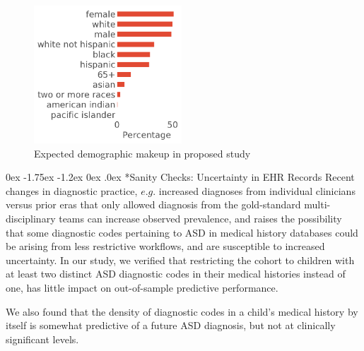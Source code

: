 \documentclass[onecolumn, compsoc,11pt]{IEEEtran}
\makeatletter
\renewcommand\subsection{\@startsection {subsection}{2}{\z@}%
                                   {0ex \@plus -1.75ex \@minus -1.2ex}%
                                   {0ex \@plus.0ex}%
                                   {\fontsize{11}{11}\selectfont\bfseries\sffamily\color{black}}}
\makeatother
\begin{document}
\begin{figure}  
  \centering
  \vspace{-17pt}
  
  \includegraphics[width=2.18in]{Figures/demo}
  \vspace{-15pt}

  
\caption{Expected demographic makeup  in proposed study}\label{tabdemo1}

\end{figure}
\subsection*{Sanity Checks: Uncertainty in EHR Records}
Recent changes in diagnostic practice, $e.g.$ increased diagnoses from individual clinicians versus prior eras that only allowed diagnosis from the gold-standard multi-disciplinary teams can  increase observed   prevalence, and  raises the possibility that  some diagnostic codes pertaining to ASD in medical history databases could be arising from less restrictive workflows, and  are susceptible to increased uncertainty.  In our study, we verified that restricting the \treatment cohort to children with at least two  distinct ASD diagnostic codes in their medical histories instead of one, has little impact on  out-of-sample predictive performance.
 
We also found that the density of diagnostic codes in a child's medical history by itself is somewhat predictive of a future ASD diagnosis, but not at clinically significant levels.
\end{document}

